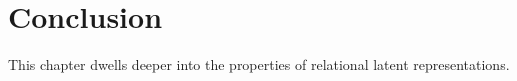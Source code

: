 %
%



\section{Conclusion}


This chapter dwells deeper into the properties of relational latent representations.



\cleardoublepage

